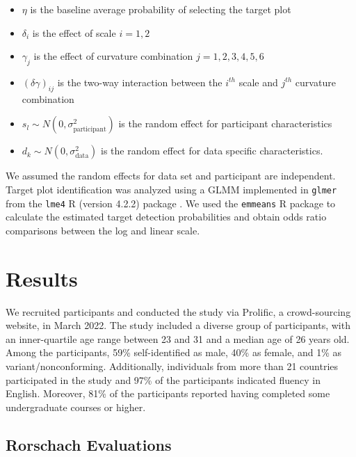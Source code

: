 \documentclass[12pt]{article}
\begin{document}
\begin{itemize}
\item $\eta$ is the baseline average probability of selecting the target plot
\item $\delta_i$ is the effect of scale $i = 1,2$
\item $\gamma_j$ is the effect of curvature combination $j = 1,2,3,4,5,6$
\item $(\delta\gamma)_{ij}$ is the two-way interaction between the $i^{th}$ scale and $j^{th}$ curvature combination
\item $s_l \sim N(0,\sigma^2_\text{participant})$ is the random effect for participant characteristics
\item $d_k \sim N(0,\sigma^2_{\text{data}})$ is the random effect for data specific characteristics. 
\end{itemize}

\noindent We assumed the random effects for data set and participant are
independent. Target plot identification was analyzed using a GLMM
implemented in \texttt{glmer} from the \texttt{lme4} R (version 4.2.2)
package \citep{lme4}. We used the \texttt{emmeans} R package
\citep{emmeans} to calculate the estimated target detection
probabilities and obtain odds ratio comparisons between the log and
linear scale.

\hypertarget{results}{%
\section{Results}\label{results}}

We recruited participants and conducted the study via Prolific, a
crowd-sourcing website, in March 2022. The study included a diverse
group of participants, with an inner-quartile age range between 23 and
31 and a median age of 26 years old. Among the participants, 59\%
self-identified as male, 40\% as female, and 1\% as
variant/nonconforming. Additionally, individuals from more than 21
countries participated in the study and 97\% of the participants
indicated fluency in English. Moreover, 81\% of the participants
reported having completed some undergraduate courses or higher.

\hypertarget{rorschach-evaluations}{%
\subsection{Rorschach Evaluations}\label{rorschach-evaluations}}
\end{document}
